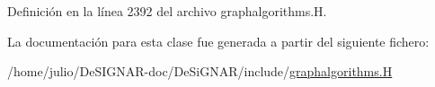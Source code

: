 Definición en la línea 2392 del archivo graphalgorithms.\+H.



La documentación para esta clase fue generada a partir del siguiente fichero\+:\begin{DoxyCompactItemize}
\item 
/home/julio/\+De\+S\+I\+G\+N\+A\+R-\/doc/\+De\+Si\+G\+N\+A\+R/include/\hyperlink{graphalgorithms_8_h}{graphalgorithms.\+H}\end{DoxyCompactItemize}
